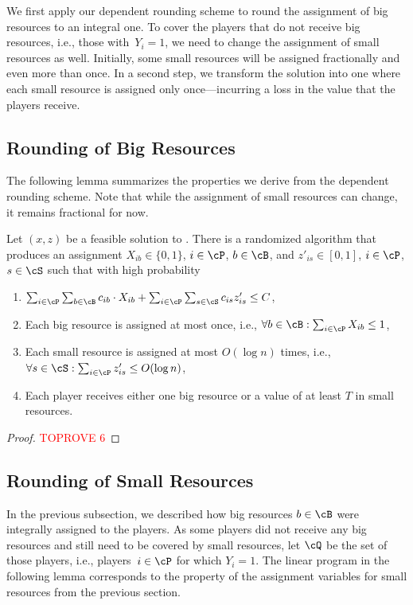 \documentclass[a4paper,USenglish,cleveref,thm-restate]{lipics-v2021}
\begin{document}
We first apply our dependent rounding scheme to round
the assignment of big resources to an integral one.
To cover the players that do not receive big resources, i.e.,
those with~$Y_i = 1$, we need to change the assignment of
small resources as well.
Initially, some small resources will be assigned fractionally
and even more than once.
In a second step, we transform the solution into one
where each small resource is assigned only once---incurring a
loss in the value that the players receive.

\subsection{Rounding of Big Resources}
\label{sec:rounding-of-big-items}
The following lemma summarizes the properties we derive
from the dependent rounding scheme. 
Note that while the assignment of small resources can change, it remains fractional for now.

\begin{lemma}
    \label{lem:cost-preservation}
    Let $(x,z)$ be a feasible solution to . There is a randomized algorithm that produces an assignment $X_{ib}\in\{0,1\}$, $i\in \cP$, $b\in\cB$, and $z'_{is}\in [0,1]$, $i\in \cP$, $s\in\cS$ such that
    with high probability
    \begin{enumerate}
        \item $\sum_{i\in\cP}\sum_{b\in\cB} c_{ib}\cdot X_{ib} +  \sum_{i\in\cP }\sum_{s\in\cS} c_{is} z'_{is} \leq C$, \label{eq:costs}
        \item Each big resource is assigned at most once, i.e., $\forall b\in \cB :\sum_{i\in\cP} X_{ib} \le 1$,
        \item Each small resource is assigned at most $O(\log n)$ times, i.e., $\forall s\in \cS: \sum_{i\in\cP} z'_{is} \le O(\log n)$,
        \item Each player receives either one big resource or a value of at least $T$ in small resources.
    \end{enumerate}
\end{lemma}
\begin{proof}\textcolor{red}{TOPROVE 6}\end{proof}

\subsection{Rounding of Small Resources}
\label{sec:rounding-of-small-items}
In the previous subsection, we described how big resources $b \in \cB$ were integrally assigned to the players.
As some players did not receive any big resources and still need to be covered by small resources, let
$\cQ$ be the set of those players, i.e., players~$i\in\cP$ 
for which $Y_i = 1$. The linear program in the following lemma
corresponds to the property of the assignment variables
for small resources from the previous section.
\end{document}
